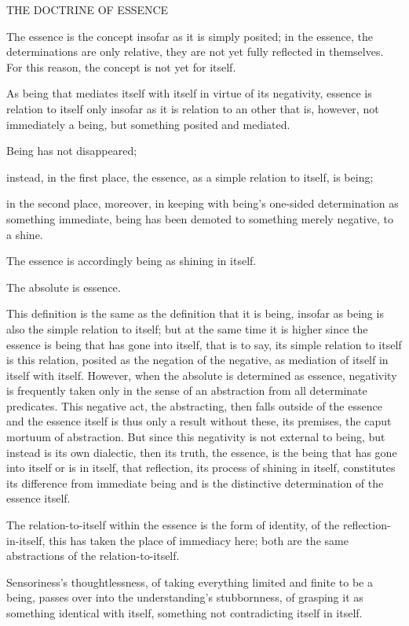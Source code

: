 
THE DOCTRINE OF ESSENCE

The essence is the concept insofar as
it is simply posited;
in the essence, the determinations are only relative,
they are not yet fully reflected in themselves.
For this reason, the concept is not yet for itself.

As being that mediates itself with itself
in virtue of its negativity,
essence is relation to itself only insofar as
it is relation to an other that is, however, not immediately a being,
but something posited and mediated.

Being has not disappeared;

instead, in the first place,
the essence, as a simple relation to itself,
is being;

in the second place, moreover,
in keeping with being's one-sided determination
as something immediate,
being has been demoted to
something merely negative,
to a shine.

The essence is accordingly
being as shining in itself.

The absolute is essence.

This definition is the same as the definition that it is being,
insofar as being is also the simple relation to itself;
but at the same time it is higher since the essence is
being that has gone into itself, that is to say,
its simple relation to itself is this relation,
posited as the negation of the negative,
as mediation of itself in itself with itself.
However, when the absolute is determined as essence,
negativity is frequently taken only in the sense of
an abstraction from all determinate predicates.
This negative act, the abstracting,
then falls outside of the essence
and the essence itself is thus only
a result without these, its premises,
the caput mortuum of abstraction.
But since this negativity is
not external to being,
but instead is its own dialectic,
then its truth, the essence,
is the being that has gone into itself or is in itself,
that reflection, its process of shining in itself,
constitutes its difference from immediate being
and is the distinctive determination of the essence itself.

The relation-to-itself within the essence is
the form of identity, of the reflection-in-itself,
this has taken the place of immediacy here;
both are the same abstractions of the relation-to-itself.

Sensoriness's thoughtlessness,
of taking everything limited and finite to be a being,
passes over into the understanding's stubbornness,
of grasping it as something identical with itself,
something not contradicting itself in itself.

